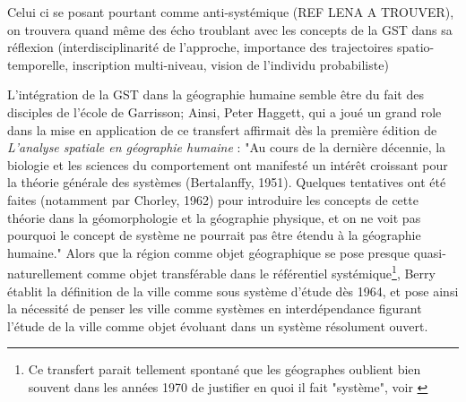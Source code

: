 {Celui ci se posant pourtant comme anti-systémique (REF LENA A TROUVER), on trouvera quand même des écho troublant avec les concepts de la GST dans sa réflexion (interdisciplinarité de l'approche, importance des trajectoires spatio-temporelle, inscription multi-niveau, vision de l'individu probabiliste)
 

L'intégration de la GST dans la géographie humaine semble être du fait des disciples de l'école de Garrisson; Ainsi, Peter Haggett, qui a joué un grand role dans la mise en application de ce transfert affirmait dès la première édition de \textit{L’analyse spatiale en géographie humaine} : "Au cours de la dernière décennie, la biologie et les sciences du comportement ont manifesté un intérêt croissant pour la théorie générale des systèmes (Bertalanffy, 1951). Quelques tentatives ont été faites (notamment par Chorley, 1962) pour introduire les concepts de cette théorie dans la géomorphologie et la géographie physique, et on ne voit pas pourquoi le concept de système ne pourrait pas être étendu à la géographie humaine." \autocite{Haggett1965} Alors que la région comme objet géographique se pose presque quasi-naturellement comme objet transférable dans le référentiel systémique\footnote{ Ce transfert parait tellement spontané que les géographes oublient bien souvent dans les années 1970 de justifier en quoi il fait "système", voir \autocite{Orain2001}}, Berry établit la définition de la ville comme sous système d'étude dès 1964, et pose ainsi la nécessité de penser les ville comme systèmes en interdépendance figurant l'étude de la ville comme objet évoluant dans un système résolument ouvert. 

}
